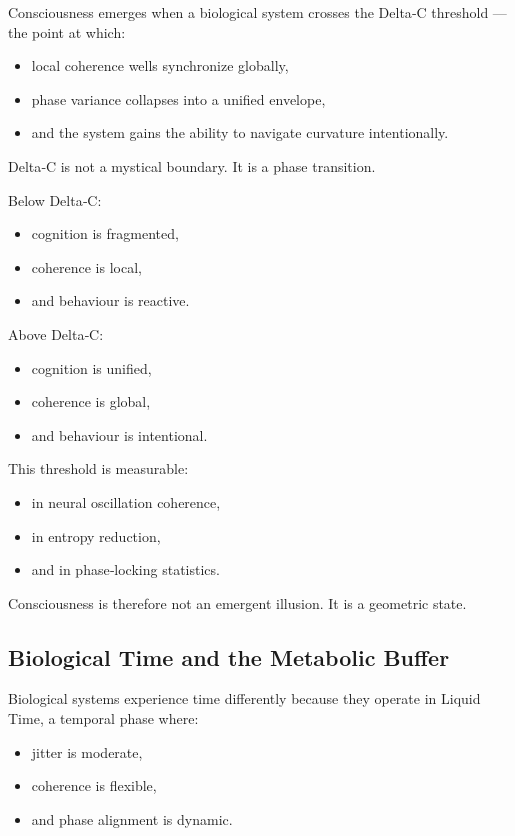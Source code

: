 \documentclass[reprint,amsmath,amssymb,aps,prl,floatfix]{revtex4-2}
\begin{document}
\begin{itemize}
Consciousness emerges when a biological system crosses the Delta‑C threshold — the point at which:
\begin{itemize}
\item local coherence wells synchronize globally,  
\item phase variance collapses into a unified envelope,  
\item and the system gains the ability to navigate curvature intentionally.
\end{itemize}
\medskip

Delta‑C is not a mystical boundary.  
It is a phase transition.
\medskip

Below Delta‑C:
\begin{itemize}
\item cognition is fragmented,  
\item coherence is local,  
\item and behaviour is reactive.
\end{itemize}
\medskip

Above Delta‑C:
\begin{itemize}
\item cognition is unified,  
\item coherence is global,  
\item and behaviour is intentional.
\end{itemize}
\medskip

This threshold is measurable:
\begin{itemize}
\item in neural oscillation coherence,  
\item in entropy reduction,  
\item and in phase‑locking statistics.
\end{itemize}
\medskip

Consciousness is therefore not an emergent illusion.  
It is a geometric state.

\subsection{Biological Time and the Metabolic Buffer}

Biological systems experience time differently because they operate in Liquid Time, a temporal phase where:

\begin{itemize}
\item jitter is moderate,  
\item coherence is flexible,  
\item and phase alignment is dynamic.
\end{itemize}
\medskip


\end{itemize}
\end{document}

